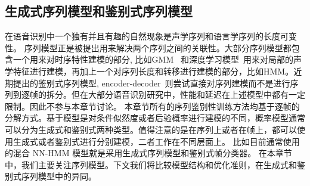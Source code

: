 

\subsection{生成式序列模型和鉴别式序列模型}
\label{Sec:sgm-and-sdm}
在语音识别中一个独有并且有趣的自然现象是声学序列和语言学序列的长度可变性。
序列模型正是被提出用来解决两个序列之间的关联性。大部分序列模型都包含一个用来对时序特性建模的部分, 比如GMM~\cite{woodland1994large} 和深度学习模型~\cite{hinton2012deep}用来对局部的声学特征进行建模，再加上一个对序列长度和转移进行建模的部分，比如HMM。近期提出的鉴别式序列模型, encoder-decoder~\cite{chan2016end}则尝试直接对序列建模而不是进行序列到逐帧的拆分。但在大部分语音识别研究中，性能和延迟在上述模型中都有一定限制。因此不参与本章节讨论。
本章节所有的序列鉴别性训练方法均基于逐帧的分解方式。基于模型是对条件似然度或者后验概率进行建模的不同，概率模型通常可以分为生成式和鉴别式两种类型。值得注意的是在序列上或者在帧上，都可以使用生成式或者鉴别式进行分别建模，二者工作在不同层面上。
比如目前通常使用的混合 NN-HMM 模型就是采用生成式序列模型和鉴别式帧分类器。
在本章节中，我们主要关注序列模型。下文我们将比较模型结构和优化准则，在生成式和鉴别式序列模型中的异同。


